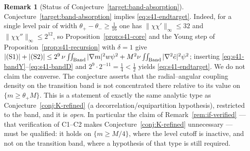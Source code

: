 \documentclass[11pt]{article}
\theoremstyle{definition}
\newtheorem{remark}[theorem]{Remark}
\theoremstyle{remark}
\begin{document}
\begin{remark}[Status of Conjecture~\ref{target:band-absorption}]
  \label{rem:s41-band-status}
  Conjecture~\ref{target:band-absorption} implies
  \eqref{eq:s41-endtarget}. Indeed, for a single level pair of width
  $\theta_+-\theta_-\geq\tfrac1{16}$ one has
  $\|\chi\chi'\|_\infty\leq32$ and $\|\chi\chi''\|_\infty\leq2^{12}$, so
  Proposition~\ref{prop:s41-core} and the Young step of
  Proposition~\ref{prop:s41-recursion} with $\delta=1$ give
  $|\text{\upshape(S1)}|+|\text{\upshape(S2)}|
  \leq 2^{9}\,\nu\iint_{\mathrm{Band}}|\nabla m|^2w\psi^2
  + M^2\nu\iint_{\mathrm{Band}}|\nabla^2\hat{e}|^2\psi^2$; inserting
  \eqref{eq:s41-bandY}--\eqref{eq:s41-bandD} and
  $2^{9}\cdot2^{-11}=\tfrac14<\tfrac12$ yields
  \eqref{eq:s41-endtarget}. We do not claim the converse. The conjecture
  asserts that the
  radial--angular coupling density on the transition band is not
  concentrated there relative to its value on $\{m\geq\theta_+M\}$. This is
  a statement of exactly the same analytic type as
  Conjecture~\ref{conj:K-refined} (a decorrelation/equipartition
  hypothesis), restricted to the band, and it is \emph{open}. In particular
  the claim of Remark~\ref{rem:if-verified} --- that verification of C1--C2
  makes Conjecture~\ref{conj:K-refined} unnecessary --- must be qualified:
  it holds on $\{m\geq M/4\}$, where the level cutoff is inactive, and not
  on the transition band, where a hypothesis of that type is still required.


\end{remark}
\end{document}
